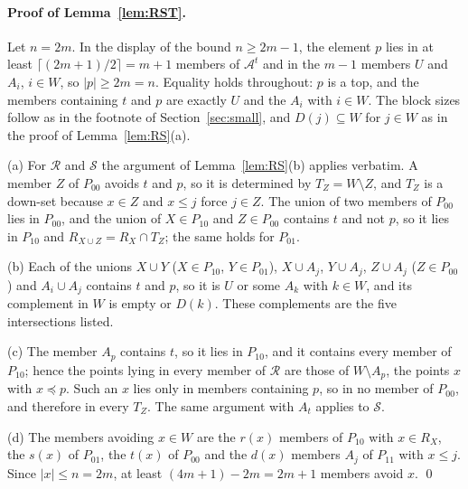 \documentclass[aps,prd,twocolumn,superscriptaddress,nofootinbib,longbibliography,floatfix,amsmath,amssymb,10pt]{revtex4-2}
\theoremstyle{plain}
\theoremstyle{definition}
\theoremstyle{plain}
\newcommand{\cA}{\mathcal{A}}
\begin{document}
\paragraph*{Proof of Lemma~\ref{lem:RST}.} Let $n=2m$. In the display of the bound $n\ge2m-1$, the element $p$ lies in at least $\lceil(2m+1)/2\rceil=m+1$ members of $\cA^t$ and in the $m-1$ members $U$ and $A_i$, $i\in W$, so $|p|\ge 2m=n$. Equality holds throughout: $p$ is a top, and the members containing $t$ and $p$ are exactly $U$ and the $A_i$ with $i\in W$. The block sizes follow as in the footnote of Section~\ref{sec:small}, and $D(j)\subseteq W$ for $j\in W$ as in the proof of Lemma~\ref{lem:RS}(a).

(a) For $\mathcal R$ and $\mathcal S$ the argument of Lemma~\ref{lem:RS}(b) applies verbatim. A member $Z$ of $P_{00}$ avoids $t$ and $p$, so it is determined by $T_Z=W\setminus Z$, and $T_Z$ is a down-set because $x\in Z$ and $x\le j$ force $j\in Z$. The union of two members of $P_{00}$ lies in $P_{00}$, and the union of $X\in P_{10}$ and $Z\in P_{00}$ contains $t$ and not $p$, so it lies in $P_{10}$ and $R_{X\cup Z}=R_X\cap T_Z$; the same holds for $P_{01}$.

(b) Each of the unions $X\cup Y$ ($X\in P_{10}$, $Y\in P_{01}$), $X\cup A_j$, $Y\cup A_j$, $Z\cup A_j$ ($Z\in P_{00}$) and $A_i\cup A_j$ contains $t$ and $p$, so it is $U$ or some $A_k$ with $k\in W$, and its complement in $W$ is empty or $D(k)$. These complements are the five intersections listed.

(c) The member $A_p$ contains $t$, so it lies in $P_{10}$, and it contains every member of $P_{10}$; hence the points lying in every member of $\mathcal R$ are those of $W\setminus A_p$, the points $x$ with $x\preceq p$. Such an $x$ lies only in members containing $p$, so in no member of $P_{00}$, and therefore in every $T_Z$. The same argument with $A_t$ applies to $\mathcal S$.

(d) The members avoiding $x\in W$ are the $r(x)$ members of $P_{10}$ with $x\in R_X$, the $s(x)$ of $P_{01}$, the $t(x)$ of $P_{00}$ and the $d(x)$ members $A_j$ of $P_{11}$ with $x\le j$. Since $|x|\le n=2m$, at least $(4m+1)-2m=2m+1$ members avoid $x$. \qed
\end{document}
